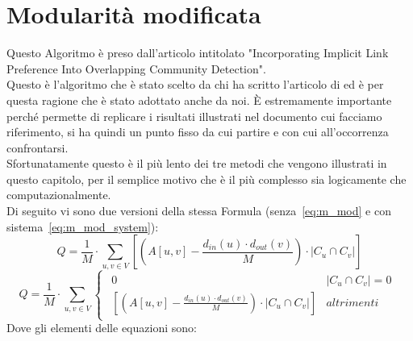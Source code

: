 \section{Modularità modificata}
Questo Algoritmo\cite{M-mod_code} è preso dall'articolo intitolato "Incorporating Implicit Link Preference Into Overlapping Community Detection"\cite{M-mod_paper}.\\
Questo è l'algoritmo che è stato scelto da chi ha scritto l'articolo di \cnrl ed è per questa ragione che è stato adottato anche da noi. È estremamente importante perché permette di replicare i risultati illustrati nel documento cui facciamo riferimento, si ha quindi un punto fisso da cui partire e con cui all'occorrenza confrontarsi.\\
Sfortunatamente questo è il più lento dei tre metodi che vengono illustrati in questo capitolo, per il semplice motivo che è il più complesso sia logicamente che computazionalmente.\\
Di seguito vi sono due versioni della stessa Formula (senza~\ref{eq:m_mod} e con sistema~\ref{eq:m_mod_system}):
\begin{equation}
	Q = \frac{1}{M} \cdot \sum_{u,v \in V}
		\left[
			\left( A \left[ u,v \right] - \frac{ d_{in}\left(u\right) \cdot d_{out}\left(v\right) }{M} \right)
			\cdot
			|C_u \cap C_v| 
		\right]
	\label{eq:m_mod}
\end{equation}
%
\begin{equation}
	Q = \frac{1}{M} \cdot \sum_{u,v \in V}
		\begin{cases}
			\begin{array}{ll}
				0 & |C_u \cap C_v| = 0 \\
				\left[ \left( A \left[ u,v \right] - \frac{ d_{in}\left(u\right) \cdot d_{out}\left(v\right) }{M} \right) \cdot |C_u \cap C_v| \right]
				& altrimenti
			\end{array}
		\end{cases}
	\label{eq:m_mod_system}
\end{equation}
Dove gli elementi delle equazioni sono:
